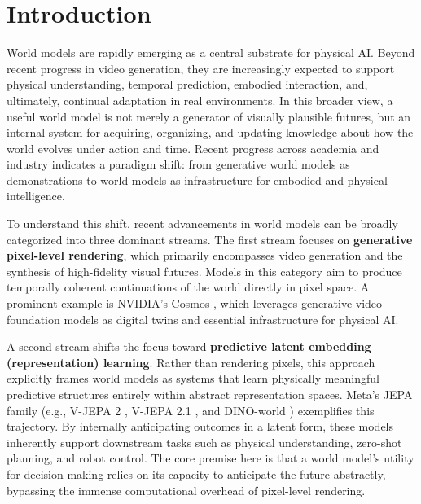 \section{Introduction}



World models \cite{WM_Survey} are rapidly emerging as a central substrate for physical AI. Beyond recent progress in video generation, they are increasingly expected to support physical understanding, temporal prediction, embodied interaction, and, ultimately, continual adaptation in real environments. In this broader view, a useful world model is not merely a generator of visually plausible futures, but an internal system for acquiring, organizing, and updating knowledge about how the world evolves under action and time. Recent progress across academia and industry indicates a paradigm shift: from generative world models as demonstrations to world models as infrastructure for embodied and physical intelligence.

To understand this shift, recent advancements in world models can be broadly categorized into three dominant streams. The first stream focuses on \textbf{generative pixel-level rendering}, which primarily encompasses video generation and the synthesis of high-fidelity visual futures. Models in this category aim to produce temporally coherent continuations of the world directly in pixel space. A prominent example is NVIDIA's Cosmos \cite{nvidia2025worldsimulationvideofoundation}, which leverages generative video foundation models as digital twins and essential infrastructure for physical AI. 


A second stream shifts the focus toward \textbf{predictive latent embedding (representation) learning}. Rather than rendering pixels, this approach explicitly frames world models as systems that learn physically meaningful predictive structures entirely within abstract representation spaces. Meta's JEPA family (e.g., V-JEPA 2 \cite{assran2025vjepa2}, V-JEPA 2.1 \cite{murlabadia2026vjepa2_1}, and DINO-world \cite{baldassarre2025featuresdinofoundationvideo}) exemplifies this trajectory. By internally anticipating outcomes in a latent form, these models inherently support downstream tasks such as physical understanding, zero-shot planning, and robot control. The core premise here is that a world model's utility for decision-making relies on its capacity to anticipate the future abstractly, bypassing the immense computational overhead of pixel-level rendering.

